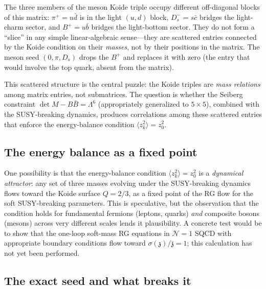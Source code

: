 \documentclass[12pt,a4paper]{article}
\newcommand{\zch}{\mathfrak{z}}
\begin{document}
The three members of the meson Koide triple occupy different 
off-diagonal blocks of this matrix: $\pi^+ = u\bar{d}$ is in the 
light $(u,d)$ block, $D_s^- = s\bar{c}$ bridges the light-charm 
sector, and $B^+ = u\bar{b}$ bridges the light-bottom sector. They 
do not form a ``slice'' in any simple linear-algebraic sense---they 
are scattered entries connected by the Koide condition on their 
\emph{masses}, not by their positions in the matrix. The meson seed 
$(0, \pi, D_s)$ drops the $B^+$ and replaces it with zero (the 
entry that would involve the top quark, absent from the matrix).

This scattered structure is the central puzzle: the Koide triples 
are \emph{mass relations} among matrix entries, not submatrices. 
The question is whether the Seiberg constraint 
$\det M - B\bar{B} = \Lambda^6$ (appropriately generalized to 
$5 \times 5$), combined with the SUSY-breaking dynamics, produces 
correlations among these scattered entries that enforce the 
energy-balance condition $\langle z_k^2\rangle = z_0^2$.

\subsection{The energy balance as a fixed point}

One possibility is that the energy-balance condition 
$\langle z_k^2\rangle = z_0^2$ is a \emph{dynamical attractor}: 
any set of three masses evolving under the SUSY-breaking dynamics 
flows toward the Koide surface $Q = 2/3$, as a fixed point of the 
RG flow for the soft SUSY-breaking parameters. This is speculative, 
but the observation that the condition holds for fundamental fermions 
(leptons, quarks) \emph{and} composite bosons (mesons) across very 
different scales lends it plausibility. A concrete test would be to 
show that the one-loop soft-mass RG equations in $\mathcal{N}=1$ 
SQCD with appropriate boundary conditions flow toward 
$\sigma(\zch)/\bar{\zch} = 1$; this calculation has not yet been 
performed.

\subsection{The exact seed and what breaks it}
\label{subsec:exactseed}
\end{document}
